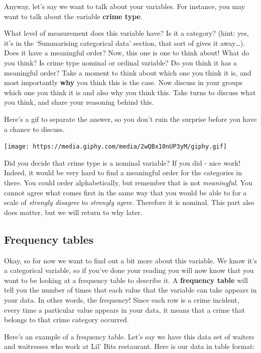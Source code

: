 \documentclass[
]{book}
\begin{document}
Anyway, let's say we want to talk about your variables. For instance, you may want to talk about the variable \textbf{crime type}.

What level of measurement does this variable have? Is it a category? (hint: yes, it's in the `Summarising categorical data' section, that sort of gives it away\ldots). Does it have a meaningful order? Now, this one is one to think about! What do you think? Is crime type nominal or ordinal variable? Do you think it has a meaningful order? Take a moment to think about which one you think it is, and most importantly \textbf{why} you think this is the case. Now discuss in your groups which one you think it is and also why you think this. Take turns to discuss what you think, and share your reasoning behind this.

Here's a gif to separate the answer, so you don't ruin the surprise before you have a chance to discuss.

\texttt{[image: https://media.giphy.com/media/2wQBx10nUP3yM/giphy.gif]}

Did you decide that crime type is a nominal variable? If you did - nice work! Indeed, it would be very hard to find a meaningful order for the categories in there. You could order alphabetically, but remember that is not \emph{meaningful}. You cannot agree what comes first in the same way that you would be able to for a scale of \emph{strongly disagree} to \emph{strongly agree}. Therefore it is nominal. This part also does matter, but we will return to why later.

\hypertarget{frequency-tables}{%
\subsection{Frequency tables}\label{frequency-tables}}

Okay, so for now we want to find out a bit more about this variable. We know it's a categorical variable, so if you've done your reading you will now know that you want to be looking at a frequency table to describe it. A \textbf{frequency table} will tell you the number of times that each value that the variable can take appears in your data. In other words, the frequency! Since each row is a crime incident, every time a particular value appears in your data, it means that a crime that belongs to that crime category occurred.

Here's an example of a frequency table. Let's say we have this data set of waiters and waitresses who work at Lil' Bits restaurant. Here is our data in table format:
\end{document}
